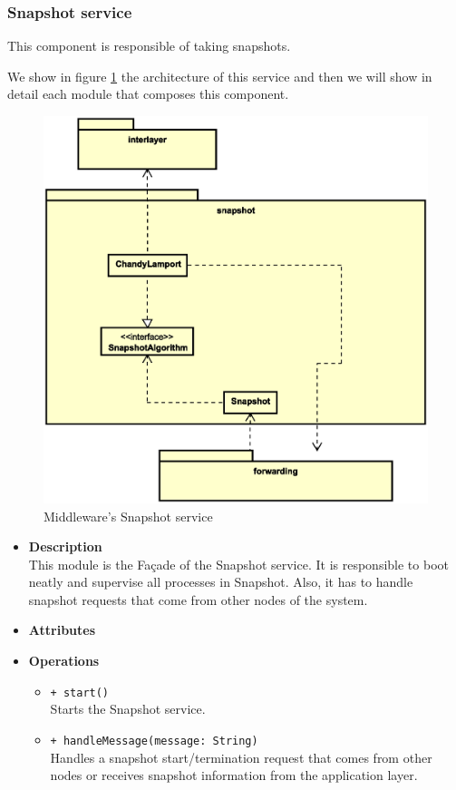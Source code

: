 \subsubsection{Snapshot service}
This component is responsible of taking snapshots.

We show in figure \ref{fig:mw-snapshot} the architecture of this service and
then we will show in detail each module that composes this component.

\begin{figure}[H]
  \centering
  \includegraphics[width=\columnwidth]{images/solution/mw/snapshot.eps}
  \caption{Middleware's Snapshot service}
  \label{fig:mw-snapshot}
\end{figure}

\FloatBarrier
\begin{itemize}
  \item \textbf{Description} \\
    This module is the Fa\c cade of the Snapshot service. It is responsible
    to boot neatly and supervise all processes in Snapshot. Also, it has to
    handle snapshot requests that come from other nodes of the system.
  \item \textbf{Attributes}
  \item \textbf{Operations}
  \begin{itemize}
    \item \texttt{+ start()} \\
    Starts the Snapshot service.
    \item \texttt{+ handleMessage(message: String)} \\
    Handles a snapshot start/termination request that comes from other nodes
    or receives snapshot information from the application layer.
  \end{itemize}
\end{itemize}

